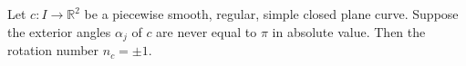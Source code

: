 Let $c: I \to \mathbb{R}^2$ be a piecewise smooth, regular, simple closed plane curve. Suppose the exterior angles $\alpha_j$ of $c$ are never equal to $\pi$ in absolute value. Then the rotation number $n_c = \pm 1$.